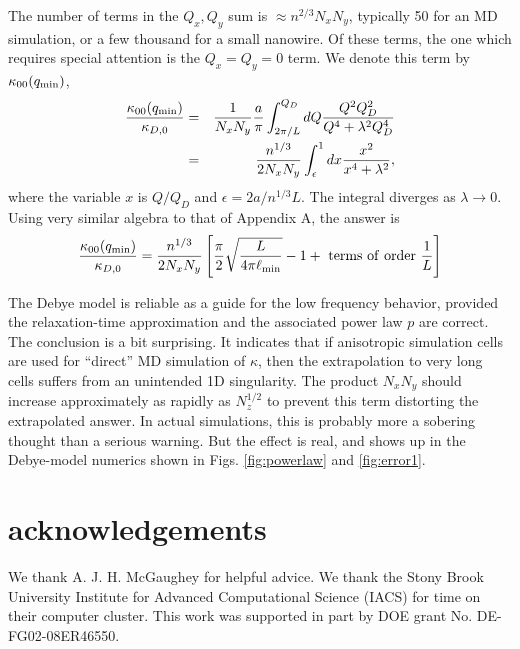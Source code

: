 \documentclass[aps,prb,twocolumn,showpacs,superscriptaddress]{revtex4-1}\begin{tiny}\end{tiny}
\begin{document}
{\begin{appendix}
The number of terms in the $Q_x,Q_y$ sum is $\approx n^{2/3}N_x N_y$, typically 50
for an MD simulation, or a few thousand for a small nanowire.  Of these terms, the one
which requires special attention is the $Q_x = Q_y = 0$ term.  We denote this
term by $\kappa_{00}(q_{\rm min})$,
%
\begin{eqnarray}
\frac{\kappa_{00}(q_{\rm min})}{\kappa_{D,0}}&=&\frac{1}{N_x N_y} 
\frac{a}{\pi}\int_{2\pi/L}^{Q_D} dQ \frac{Q^2 Q_D^2 } {  Q^4 + \lambda^2 Q_D^4  }\nonumber \\
&=& \frac{n^{1/3}}{2N_x N_y}\int_\epsilon^1 dx \frac{x^2}{x^4 + \lambda^2},
\label{eq:B3}
\end{eqnarray}
%
where the variable $x$ is $Q/Q_D$ and $\epsilon=2a/n^{1/3}L$.
The integral diverges as $\lambda\rightarrow 0$.  Using very similar algebra to that
of Appendix A, the answer is
%
\begin{equation}
\frac{\kappa_{00}(q_{\rm min})}{\kappa_{D,0}}= \frac{n^{1/3}}{2N_x N_y}
\left[\frac{\pi}{2}\sqrt{\frac{L}{4\pi\ell_{\rm min}}} - 1 + \ {\rm terms \ of \ order} \ \frac{1}{L}\right]
\label{eq:B4}
\end{equation}
%

The Debye model is reliable as a guide for the low frequency behavior, provided the
relaxation-time approximation and the associated power law $p$ are correct.  The
conclusion is a bit surprising.  It indicates that if anisotropic simulation cells are used
for ``direct'' MD simulation of $\kappa$, then the extrapolation to very long cells suffers
from an unintended 1D singularity.  The product $N_x N_y$ should increase approximately
as rapidly as $N_z^{1/2}$ to prevent this term distorting the extrapolated answer.
In actual simulations, this is probably more a sobering thought than a serious warning.
But the effect is real, and shows up in the Debye-model numerics shown in Figs. 
\ref{fig:powerlaw} and \ref{fig:error1}. 




\end{appendix}



\section{acknowledgements}
We thank A. J. H. McGaughey for helpful advice.
We thank the Stony Brook University Institute for Advanced Computational Science (IACS) 
for time on their computer cluster.
This work was supported in part by DOE grant No. DE-FG02-08ER46550.

}
\end{document}
